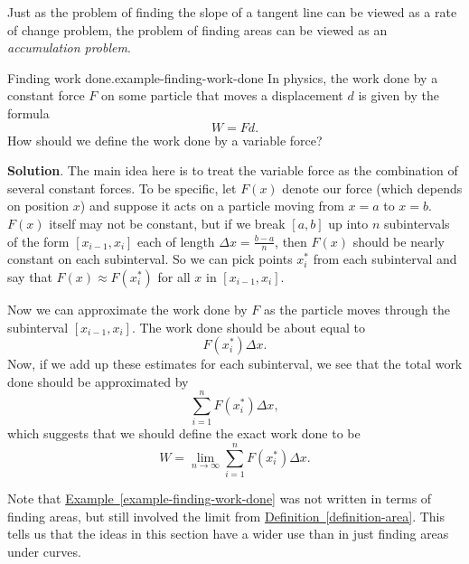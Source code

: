 \documentclass[10pt,]{book}
\numberwithin{equation}{section}
\begin{document}
\hypertarget{p-420}{}%
Just as the problem of finding the slope of a tangent line can be viewed as a rate of change problem, the problem of finding areas can be viewed as an \emph{accumulation problem}.%
\begin{example}{Finding work done.}{example-finding-work-done}%
\hypertarget{p-421}{}%
In physics, the work done by a constant force \(F\) on some particle that moves a displacement \(d\) is given by the formula%
\begin{equation*}
W = Fd.
\end{equation*}
How should we define the work done by a variable force?%
\par\smallskip%
\noindent\textbf{Solution}.\hypertarget{solution-93}{}\quad%
\hypertarget{p-422}{}%
The main idea here is to treat the variable force as the combination of several constant forces. To be specific, let \(F(x)\) denote our force (which depends on position \(x\)) and suppose it acts on a particle moving from \(x=a\) to \(x=b\). \(F(x)\) itself may not be constant, but if we break \([a,b]\) up into \(n\) subintervals of the form \([x_{i-1},x_{i}]\) each of length \(\Delta x = \frac{b-a}{n}\), then \(F(x)\) should be nearly constant on each subinterval. So we can pick points \(x_{i}^{*}\) from each subinterval and say that \(F(x)\approx F(x_{i}^{*})\) for all \(x\) in \([x_{i-1},x_{i}]\).%
\par
\hypertarget{p-423}{}%
Now we can approximate the work done by \(F\) as the particle moves through the subinterval \([x_{i-1},x_{i}]\). The work done should be about equal to%
\begin{equation*}
F(x_{i}^{*})\Delta x\text{.}
\end{equation*}
Now, if we add up these estimates for each subinterval, we see that the total work done should be approximated by%
\begin{equation*}
\sum_{i=1}^{n}F(x_{i}^{*})\Delta x,
\end{equation*}
which suggests that we should define the exact work done to be%
\begin{equation*}
W = \lim_{n\to\infty}\sum_{i=1}^{n}F(x_{i}^{*})\Delta x.
\end{equation*}
%
\end{example}
\hypertarget{p-424}{}%
Note that \hyperref[example-finding-work-done]{Example~\ref{example-finding-work-done}} was not written in terms of finding areas, but still involved the limit from \hyperref[definition-area]{Definition~\ref{definition-area}}. This tells us that the ideas in this section have a wider use than in just finding areas under curves.%
%
%
\typeout{************************************************}
\typeout{************************************************}
%
\end{document}
